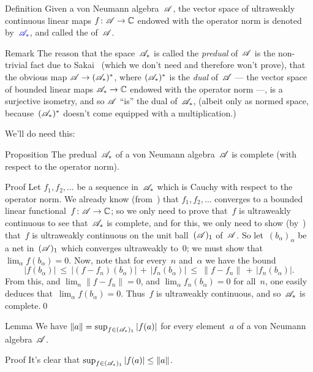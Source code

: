 \documentclass[a]{subfiles}
\begin{document}
\begin{parsec}%
\begin{point}{Definition}%
Given a von Neumann algebra~$\mathscr{A}$,
the vector space of ultraweakly continuous 
linear maps $f\colon \mathscr{A}\to \mathbb{C}$
endowed with the operator norm
is denoted by~$\Define{\scrA_*}$,
and called the  of~$\mathscr{A}$.
\begin{point}{Remark}%
The reason
that the space~$\mathscr{A}_*$ is called the \emph{predual}
of~$\mathscr{A}$
is the non-trivial fact due to Sakai~\cite{sakai} (which we 
don't need and therefore won't prove),
that the obvious 
map $\mathscr{A}\to(\mathscr{A}_*)^*$,
where $(\mathscr{A}_*)^*$ is the \emph{dual} of~$\mathscr{A}$ --- the
vector space of bounded linear maps $\mathscr{A}_*\to\mathbb{C}$
endowed with the operator norm ---,
is a surjective isometry,
and so $\mathscr{A}$ ``is'' the dual of~$\mathscr{A}_*$,
(albeit only as normed space,
because~$(\mathscr{A}_*)^*$ doesn't come equipped with a multiplication.)

We'll do need this:
\end{point}
\end{point}
\begin{point}{Proposition}%
The predual~$\mathscr{A}_*$ of a von Neumann algebra~$\mathscr{A}$
is complete (with respect to the operator norm).
\begin{point}{Proof}%
Let $f_1,f_2,\dotsc$ be a sequence in~$\mathscr{A}_*$
which is Cauchy with respect to the operator norm.
We already know (from~)
that $f_1,f_2,\dotsc$ converges to a bounded linear 
functional~$f\colon \mathscr{A}\to\mathbb{C}$;
so we only need to prove that~$f$ is ultraweakly continuous
to see that~$\mathscr{A}_*$ is complete,
and for this,
we only need to show 
(by~)
that~$f$
is ultraweakly continuous
on the unit ball~$(\mathscr{A})_1$ of~$\mathscr{A}$.
So let~$(b_\alpha)_\alpha$ be 
a net in~$(\mathscr{A})_1$
which converges ultraweakly to~$0$;
we must show that~$\lim_\alpha f(b_\alpha)=0$.
Now, note that for every~$n$ and~$\alpha$
we have the bound
\begin{equation*}
	\left|f(b_\alpha)\right|
	\ \leq\ \left|(f-f_n)(b_\alpha)\right|
	\,+\,\left|f_n(b_\alpha)\right|
	\ \leq\ 
	\|f-f_n\|\,+\,\left|f_n(b_\alpha)\right|.
\end{equation*}
From this,
and $\lim_n\|f-f_n\|=0$,
and $\lim_\alpha f_n(b_\alpha)=0$
for all~$n$,
one easily deduces that~$\lim_\alpha f(b_\alpha)=0$.
Thus~$f$ is ultraweakly continuous,
and so~$\mathscr{A}_*$ is complete.\qed
\end{point}
\end{point}
\begin{point}[norm-predual]{Lemma}%
We have $\|a\|=\sup_{f\in(\mathscr{A}_*)_1}\left|f(a)\right|$
for every element~$a$ of a von Neumann algebra~$\mathscr{A}$.
\begin{point}{Proof}%
It's clear that $\sup_{f\in(\mathscr{A}_*)_1}\left|f(a)\right|\leq \|a\|$.


\end{point}
\end{point}
\end{parsec}
\end{document}
